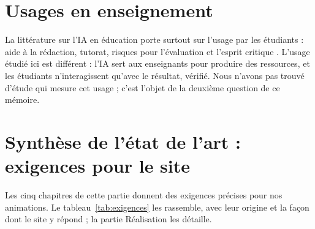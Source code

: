 \section{Usages en enseignement}

La littérature sur l'IA en éducation porte surtout sur l'usage par les
étudiants : aide à la rédaction, tutorat, risques pour l'évaluation et
l'esprit critique \cite{kasneci2023}. L'usage étudié ici est différent :
l'IA sert aux enseignants pour produire des ressources, et les étudiants
n'interagissent qu'avec le résultat, vérifié. Nous n'avons pas trouvé
d'étude qui mesure cet usage ; c'est l'objet de la deuxième question de ce
mémoire.

\section{Synthèse de l'état de l'art : exigences pour le site}

Les cinq chapitres de cette partie donnent des exigences précises pour nos
animations. Le tableau~\ref{tab:exigences} les rassemble, avec leur origine et
la façon dont le site y répond ; la partie Réalisation les détaille.

